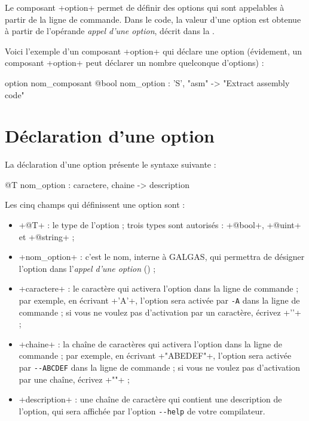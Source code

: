 


Le composant \ggs+option+ permet de définir des options qui sont appelables à partir de la ligne de commande. Dans le code, la valeur d'une option est obtenue à partir de l'opérande \emph{appel d'une option}, décrit dans la .

Voici l'exemple d'un composant \ggs+option+ qui déclare une option (évidement, un composant \ggs+option+ peut déclarer un nombre quelconque d'options) :
\begin{galgascode}
option nom_composant {
  @bool nom_option : 'S', "asm" -> "Extract assembly code"
}
\end{galgascode}


\section{Déclaration d'une option}

La déclaration d'une option présente le syntaxe suivante :
\begin{galgascode}
  @T nom_option : caractere, chaine -> description
\end{galgascode}

Les cinq champs qui définissent une option sont :
\begin{itemize}
  \item \ggs+@T+ : le type de l'option ; trois types sont autorisés : \ggs+@bool+, \ggs+@uint+ et \ggs+@string+ ;
  \item \ggs+nom_option+ : c'est le nom, interne à GALGAS, qui permettra de désigner l'option dans l'\emph{appel d'une option} () ; 
  \item \ggs+caractere+ : le caractère qui activera l'option dans la ligne de commande ; par exemple, en écrivant \ggs+'A'+, l'option sera activée par \texttt{-A} dans la ligne de commande ; si vous ne voulez pas d'activation par un caractère, écrivez \ggs+'\0'+ ;
  \item \ggs+chaine+ : la chaîne de caractères qui activera l'option dans la ligne de commande ; par exemple, en écrivant \ggs+"ABEDEF"+, l'option sera activée par \texttt{-{}-ABCDEF} dans la ligne de commande ; si vous ne voulez pas d'activation par une chaîne, écrivez \ggs+""+ ;
  \item \ggs+description+ : une chaîne de caractère qui contient une description de l'option, qui sera affichée par l'option \texttt{-{}-help} de votre compilateur.
\end{itemize}








